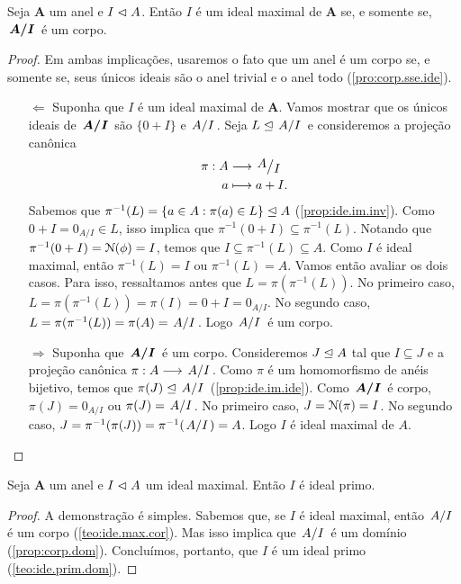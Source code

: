 \begin{teo}
\label{teo:ide.max.cor}
	Seja $\bm A$ um anel e $I \mathrel{\lhd} A$. Então $I$ é um ideal maximal de $\bm A$ se, e somente se, $\bm{\quo{A}{I}}$ é um corpo.
\end{teo}
\begin{proof} Em ambas implicações, usaremos o fato que um anel é um corpo se, e somente se, seus únicos ideais são o anel trivial e o anel todo (\ref{pro:corp.sse.ide}).
	\begin{enumerate}
	\item[$\Leftarrow$] Suponha que $I$ é um ideal maximal de $\bm A$.  Vamos mostrar que os únicos ideais de $\bm{\quo{A}{I}}$ são $\{0+I\}$ e $\quo{A}{I}$. Seja $L \ide \quo{A}{I}$ e consideremos a projeção canônica
	\begin{align*}
	\func{\pi}{A}{\quo{A}{I}}{a}{a+I.}
	\end{align*}
Sabemos que $\pi^{-1}(L)=\{a \in A : \pi(a) \in L\} \mathrel{\unlhd} A$ (\ref{prop:ide.im.inv}). Como $0+I=0_{A/I} \in L$, isso implica que $\pi^{-1}(0+I) \subseteq \pi^{-1}(L)$. Notando que $\pi^{-1}(0+I)=\mathcal{N}(\phi)=I$, temos que $I \subseteq \pi^{-1}(L) \subseteq A$. Como $I$ é ideal maximal, então $\pi^{-1}(L)=I$ ou $\pi^{-1}(L)=A$. Vamos então avaliar os dois casos. Para isso, ressaltamos antes que $L=\pi(\pi^{-1}(L))$. No primeiro caso, $L=\pi(\pi^{-1}(L))=\pi(I)=0+I=0_{A/I}$. No segundo caso, $L=\pi(\pi^{-1}(L))=\pi(A)=\quo{A}{I}$. Logo $\quo{A}{I}$ é um corpo.
	\item[$\Rightarrow$] Suponha que $\bm{\quo{A}{I}}$ é um corpo. Consideremos $J \mathrel{\unlhd} A$ tal que $I \subseteq J$ e a projeção canônica $\pi: A \to \quo{A}{I}$. Como $\pi$ é um homomorfismo de anéis bijetivo, temos que $\pi(J) \ide \quo{A}{I}$ (\ref{prop:ide.im.ide}). Como $\bm{\quo{A}{I}}$ é corpo, $\pi(J)={0_{A/I}}$ ou $\pi(J)=\quo{A}{I}$. No primeiro caso, $J=\mathcal{N}(\pi)=I$. No segundo caso, $J=\pi^{-1}(\pi(J))=\pi^{-1}(\quo{A}{I})=A$. Logo $I$ é ideal maximal de $A$.
	\end{enumerate}
\end{proof}

\begin{prop}
	Seja $\bm A$ um anel e $I \mathrel{\lhd} A$ um ideal maximal. Então $I$ é ideal primo.
\end{prop}
\begin{proof}
	A demonstração é simples. Sabemos que, se $I$ é ideal maximal, então $\quo{A}{I}$ é um corpo (\ref{teo:ide.max.cor}). Mas isso implica que $\quo{A}{I}$ é um domínio (\ref{prop:corp.dom}). Concluímos, portanto, que $I$ é um ideal primo (\ref{teo:ide.prim.dom}).
\end{proof}


